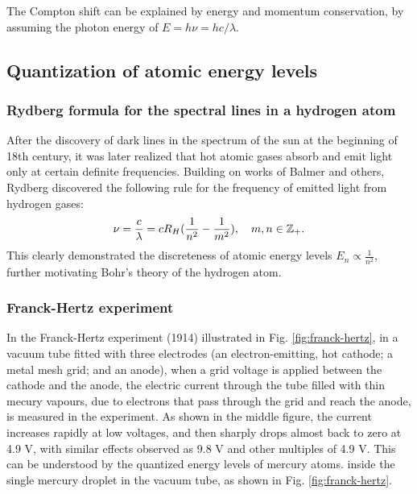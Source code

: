 The Compton shift can be explained by energy and momentum conservation, by assuming the photon energy of $E=h\nu=hc/\lambda$. 


\subsection{Quantization of atomic energy levels}


\subsubsection{Rydberg formula for the spectral lines in a hydrogen atom}

After the discovery of dark lines in the spectrum of the sun at the beginning of 18th century, it was later realized that hot atomic gases absorb and emit light only at certain definite frequencies. Building on works of Balmer and others, Rydberg discovered the following rule\cite{Rydberg1890} for the frequency of emitted light from hydrogen gases:
\begin{align}\label{rydberg rule}
\nu=\frac c\lambda=cR_H(\frac1{n^2}-\frac1{m^2}),~~~m,n\in{\mathbb{Z}}_+.
\end{align}
This clearly demonstrated the discreteness of atomic energy levels $E_n\propto\frac1{n^2}$, further motivating Bohr's theory of the hydrogen atom. 

\subsubsection{Franck-Hertz experiment}

In the Franck-Hertz experiment (1914) illustrated in Fig. \ref{fig:franck-hertz}, in a vacuum tube fitted with three electrodes (an electron-emitting, hot cathode; a metal mesh grid; and an anode), when a grid voltage is applied between the cathode and the anode, the electric current through the tube filled with thin mecury vapours, due to electrons that pass through the grid and reach the anode, is measured in the experiment. As shown in the middle figure, the current increases rapidly at low voltages, and then sharply drops almost back to zero at 4.9 V, with similar effects observed as 9.8 V and other multiples of 4.9 V. This can be understood by the quantized energy levels of mercury atoms. inside the single mercury droplet in the vacuum tube, as shown in Fig. \ref{fig:franck-hertz}.

